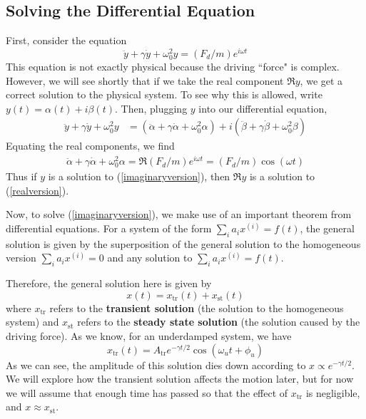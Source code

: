 \subsection*{Solving the Differential Equation}
First, consider the equation 
\begin{equation} \label{imaginaryversion}
    \ddot y + \gamma\dot y + \omega_0^2y = (F_d/m)e^{i\omega t}
\end{equation}
This equation is not exactly physical because the driving ``force" is complex. However, we will see shortly that if we take the real component $\Re y$, we get a correct solution to the physical system. To see why this is allowed, write $y(t) = \alpha(t) + i\beta(t)$. Then, plugging $y$ into our differential equation,
\begin{align*}
    \ddot y + \gamma \dot y + \omega_0^2y &= (\ddot \alpha+\gamma\dot \alpha+\omega_0^2\alpha)+i(\ddot \beta+\gamma\dot\beta + \omega_0^2\beta) 
\end{align*}
Equating the real components, we find
\begin{align*}
    \ddot \alpha + \gamma\dot\alpha+\omega_0^2\alpha = \Re (F_d/m)e^{i\omega t} = (F_d/m)\cos(\omega t)
\end{align*}
Thus if $y$ is a solution to (\ref{imaginaryversion}), then $\Re y$ is a solution to (\ref{realversion}).

Now, to solve (\ref{imaginaryversion}), we make use of an important theorem from differential equations. For a system of the form $\sum_i a_ix^{(i)} = f(t)$, the general solution is given by the superposition of the general solution to the homogeneous version $\sum_i a_ix^{(i)} = 0$ and any solution to $\sum_i a_ix^{(i)} = f(t)$. 

Therefore, the general solution here is given by
\[ x(t) = x_\text{tr}(t) + x_\text{st}(t) \]
where $x_\text{tr}$ refers to the \textbf{transient solution} (the solution to the homogeneous system) and $x_\text{st}$ refers to the \textbf{steady state solution} (the solution caused by the driving force). As we know, for an underdamped system, we have
\[ x_\text{tr}(t) = A_\text{tr}e^{-\gamma t/2} \cos(\omega_ut + \phi_u)\]
As we can see, the amplitude of this solution dies down according to $x\propto e^{-\gamma t/2}$. We will explore how the transient solution affects the motion later, but for now we will assume that enough time has passed so that the effect of $x_\text{tr}$ is negligible, and $x\approx x_\text{st}$.

